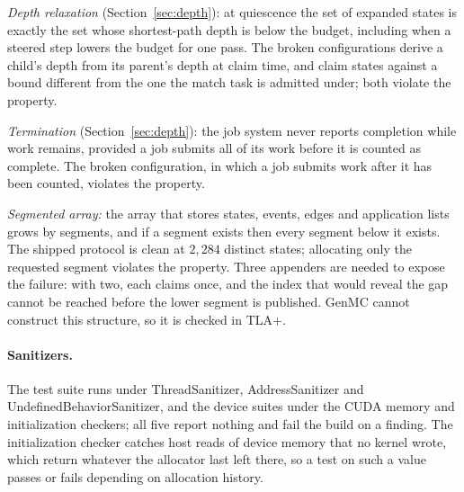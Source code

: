 \begin{table}[htbp]
\centering
\caption{\textbf{Forwarding completeness under TLA+}, exhaustive at the bound of four states, three
matches and three edges, with a discovery mid-chain that enables a grandchild. \emph{Ownership}:
the claim winner both stores and propagates the match; \emph{batched}: a state's matches are
submitted together after its matching completes.}
\label{tab:tla}
\end{table}

\emph{Depth relaxation} (Section~\ref{sec:depth}): at quiescence the set of expanded states is
exactly the set whose shortest-path depth is below the budget, including when a steered step lowers
the budget for one pass. The broken configurations derive a child's depth from its parent's depth
at claim time, and claim states against a bound different from the one the match task is admitted
under; both violate the property.

\emph{Termination} (Section~\ref{sec:depth}): the job system never reports completion while work
remains, provided a job submits all of its work before it is counted as complete. The broken
configuration, in which a job submits work after it has been counted, violates the property.

\emph{Segmented array:} the array that stores states, events, edges and application lists grows by
segments, and if a segment exists then every segment below it exists. The shipped protocol is
clean at $2{,}284$ distinct states; allocating only the requested segment violates the property.
Three appenders are needed to expose the failure: with two, each claims once, and the index that
would reveal the gap cannot be reached before the lower segment is published. GenMC cannot
construct this structure, so it is checked in TLA+.

\paragraph{Sanitizers.}
The test suite runs under ThreadSanitizer, AddressSanitizer and UndefinedBehaviorSanitizer, and the
device suites under the CUDA memory and initialization checkers; all five report nothing and fail
the build on a finding. The initialization checker catches host reads of device memory that no
kernel wrote, which return whatever the allocator last left there, so a test on such a value passes
or fails depending on allocation history.

